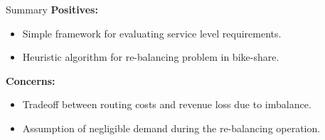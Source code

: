     \begin{frame}{Summary}
    	\textbf{Positives:}
    	\begin{itemize}
    		\item Simple framework for evaluating service level requirements.
    		\item Heuristic algorithm for re-balancing problem in bike-share.
    	\end{itemize}
    		\vspace{0.1in}
    		\pause
    	\textbf{Concerns:}
    	\begin{itemize}
    		\item \alert{Tradeoff between routing costs and revenue loss due to imbalance.}
    		\item \alert{Assumption of negligible demand during the re-balancing operation.}
    	\end{itemize}
    \end{frame}